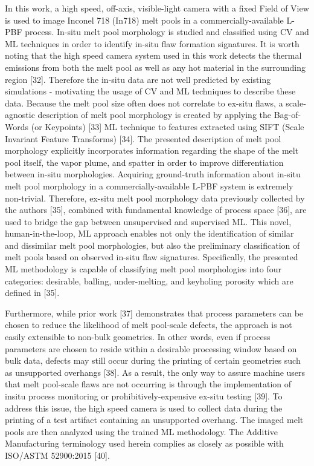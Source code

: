 \documentclass[10pt]{article}
\begin{document}
In this work, a high speed, off-axis, visible-light camera with a fixed Field of View is used to image Inconel 718 (In718) melt pools in a commercially-available L-PBF process. In-situ melt pool morphology is studied and classified using CV and ML techniques in order to identify in-situ flaw formation signatures. It is worth noting that the high speed camera system used in this work detects the thermal emissions from both the melt pool as well as any hot material in the surrounding region [32]. Therefore the in-situ data are not well predicted by existing simulations - motivating the usage of CV and ML techniques to describe these data. Because the melt pool size often does not correlate to ex-situ flaws, a scale-agnostic description of melt pool morphology is created by applying the Bag-of-Words (or Keypoints) [33] ML technique to features extracted using SIFT (Scale Invariant Feature Transforms) [34]. The presented description of melt pool morphology explicitly incorporates information regarding the shape of the melt pool itself, the vapor plume, and spatter in order to improve differentiation between in-situ morphologies. Acquiring ground-truth information about in-situ melt pool morphology in a commercially-available L-PBF system is extremely non-trivial. Therefore, ex-situ melt pool morphology data previously collected by the authors [35], combined with fundamental knowledge of process space [36], are used to bridge the gap between unsupervised and supervised ML. This novel, human-in-the-loop, ML approach enables not only the identification of similar and dissimilar melt pool morphologies, but also the preliminary classification of melt pools based on observed in-situ flaw signatures. Specifically, the presented ML methodology is capable of classifying melt pool morphologies into four categories: desirable, balling, under-melting, and keyholing porosity which are defined in [35].

Furthermore, while prior work [37] demonstrates that process parameters can be chosen to reduce the likelihood of melt pool-scale defects, the approach is not easily extensible to non-bulk geometries. In other words, even if process parameters are chosen to reside within a desirable processing window based on bulk data, defects may still occur during the printing of certain geometries such as unsupported overhangs [38]. As a result, the only way to assure machine users that melt pool-scale flaws are not occurring is through the implementation of insitu process monitoring or prohibitively-expensive ex-situ testing [39]. To address this issue, the high speed camera is used to collect data during the printing of a test artifact containing an unsupported overhang. The imaged melt pools are then analyzed using the trained ML methodology. The Additive Manufacturing terminology used herein complies as closely as possible with ISO/ASTM 52900:2015 [40].
\end{document}
